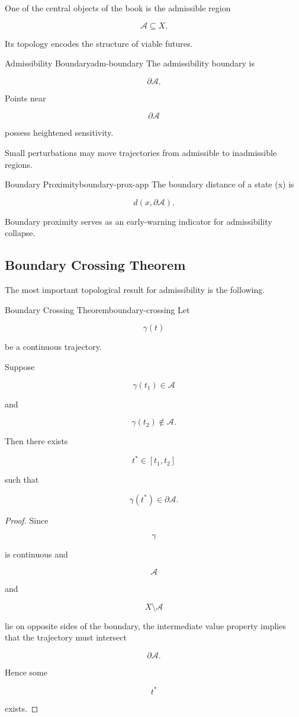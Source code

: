 \documentclass[12pt,twoside,openright]{book}
\begin{document}
One of the central objects of the book is the admissible
region

\[
\mathcal A
\subseteq X.
\]

Its topology encodes the structure of viable futures.

\begin{definition}{Admissibility Boundary}{adm-boundary}
The admissibility boundary is

\[
\partial\mathcal A.
\]
\end{definition}

Points near

\[
\partial\mathcal A
\]

possess heightened sensitivity.

Small perturbations may move trajectories from admissible
to inadmissible regions.

\begin{definition}{Boundary Proximity}{boundary-prox-app}
The boundary distance of a state (x) is

\[
d(x,\partial\mathcal A).
\]
\end{definition}

Boundary proximity serves as an early-warning indicator
for admissibility collapse.

\subsection{Boundary Crossing Theorem}

The most important topological result for admissibility is
the following.

\begin{theorem}{Boundary Crossing Theorem}{boundary-crossing}
Let

\[
\gamma(t)
\]

be a continuous trajectory.

Suppose

\[
\gamma(t_1)
\in
\mathcal A
\]

and

\[
\gamma(t_2)
\notin
\mathcal A.
\]

Then there exists

\[
t^*
\in[t_1,t_2]
\]

such that

\[
\gamma(t^*)
\in
\partial\mathcal A.
\]
\end{theorem}

\begin{proof}
Since

\[
\gamma
\]

is continuous and

\[
\mathcal A
\]

and

\[
X\setminus\mathcal A
\]

lie on opposite sides of the boundary, the intermediate
value property implies that the trajectory must intersect

\[
\partial\mathcal A.
\]

Hence some

\[
t^*
\]

exists.
\end{proof}
\end{document}
